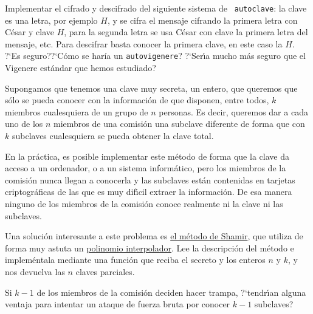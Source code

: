 \begin{ejer}

 Implementar el cifrado y descifrado del siguiente  sistema de {\tt
autoclave}: la clave es una letra, por ejemplo $H$, y se cifra el mensaje 
cifrando la primera letra con C\'esar y clave $H$, para la segunda letra se usa 
C\'esar con clave la primera letra del mensaje, etc. Para descifrar basta 
conocer la primera clave, en este caso la $H$. ?`Es seguro??`Cómo se haría un 
{\tt autovigenere}? ?`Ser\'{\i}a mucho m\'as seguro que el Vigenere 
est\'andar  que hemos estudiado?
\end{ejer}

\begin{ejer}

Supongamos que tenemos una clave muy secreta, un entero,  que queremos que 
s\'olo se pueda conocer con la informaci\'on de que disponen, entre todos, $k$ 
miembros cualesquiera de un grupo de $n$ personas. Es decir, queremos dar a 
cada uno de los $n$ miembros de una comisi\'on  una subclave diferente de forma 
que con $k$ subclaves cualesquiera se pueda obtener la clave total. 

En la pr\'actica, es posible implementar este m\'etodo de forma que la clave da 
acceso a un ordenador, o a un sistema inform\'atico, pero los miembros de la 
comisi\'on nunca llegan a conocerla y las subclaves est\'an contenidas en 
tarjetas criptogr\'aficas de las que es muy dif\'{\i}cil extraer la 
informaci\'on. De esa manera ninguno de los miembros de la comisi\'on conoce 
realmente ni la clave ni las subclaves. 

Una soluci\'on interesante a este problema es 
\href{http://en.wikipedia.org/wiki/Shamir's_Secret_Sharing}{el m\'etodo de 
Shamir}, que utiliza de forma muy astuta un \hyperref[pol-int]{polinomio 
interpolador}.  Lee la descripci\'on del m\'etodo e implem\'entala mediante una 
funci\'on que reciba el secreto y los enteros $n$ y $k$,  y nos devuelva las 
$n$ claves parciales. 

Si $k-1$ de los miembros de la comisi\'on deciden hacer trampa, ?`tendr\'{\i}an 
alguna ventaja para intentar un ataque de fuerza bruta por conocer $k-1$ 
subclaves?
\end{ejer}


